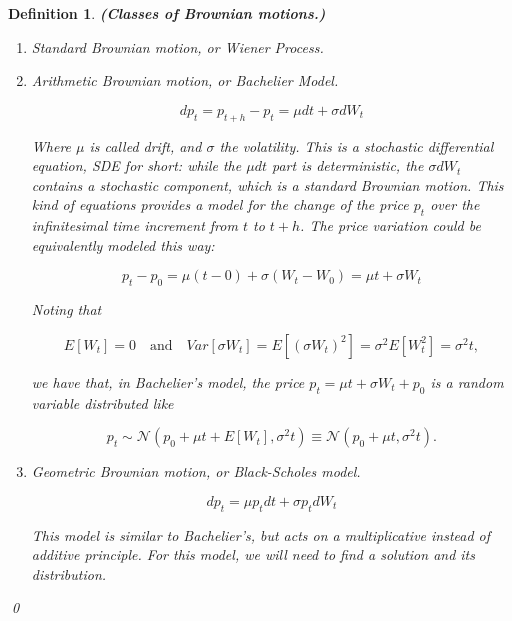 \documentclass[oneside,titlepage,headinclude,12pt,a4paper,BCOR5mm,footinclude]{book}
\theoremstyle{defn}
\newtheorem{defn}{Definition}
\begin{document}

\begin{defn}\textbf{(Classes of Brownian motions.)}

\begin{enumerate}[label=(\Roman*)]
  \item \textit{Standard Brownian motion}, or \textit{Wiener Process}.
  \item \textit{Arithmetic Brownian motion}, or \textit{Bachelier Model}.
    
    \[
      dp_t = p_{t+h} - p_t = \mu dt + \sigma dW_t
    \]

    Where    $\mu$    is    called   \textit{drift},    and    $\sigma$    the
    \textit{volatility}. This is  a \textit{stochastic differential equation},
    \textit{SDE} for short: while the $\mu dt$ part is \textit{deterministic},
    the $\sigma  dW_t$ contains  a \textit{stochastic}  component, which  is a
    standard Brownian motion. This kind of  equations provides a model for the
    change of the  price $p_t$ over the infinitesimal time  increment from $t$
    to $t+h$. The price variation could be equivalently modeled this way:

    \[
      p_t - p_0 = \mu(t-0) + \sigma(W_t - W_0) = \mu t + \sigma W_t
    \]
    
    Noting that 

    \[ 
      E[W_t]  =  0
      \quad \text{and} \quad
      Var[\sigma W_t]  =  E[(\sigma W_t)^2]  = \sigma^2 E[W_t^2] =  \sigma^2 t,
    \]

    we have that, in Bachelier's model, the price  $p_t = \mu t + \sigma W_t +
    p_0$ is a \textit{random variable} distributed like

    \[
      p_t \sim \mathcal{N}(p_0 + \mu t + E[W_t], \sigma^2 t) \equiv
        \mathcal{N}(p_0 + \mu t, \sigma^2 t).
    \]

  \item \textit{Geometric Brownian motion}, or \textit{Black-Scholes model}.

    \[
      dp_t = \mu p_t dt + \sigma p_t dW_t
    \]

    This model is similar to Bachelier's, but acts on a multiplicative instead
    of additive principle. For this model, we will need to find a solution and
    its distribution.

\end{enumerate}
\qed
\end{defn}
\end{document}
